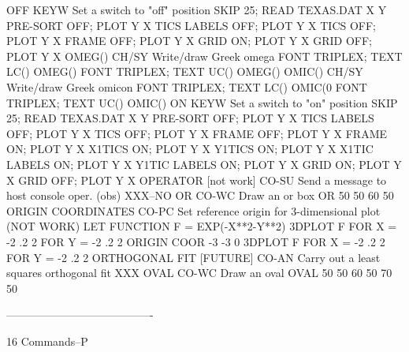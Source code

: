 OFF                         KEYW  Set a switch to "off" position
                                  SKIP 25; READ TEXAS.DAT X Y
                                  PRE-SORT OFF; PLOT Y X
                                  TICS LABELS OFF; PLOT Y X
                                  TICS OFF; PLOT Y X
                                  FRAME OFF; PLOT Y X
                                  GRID ON; PLOT Y X
                                  GRID OFF; PLOT Y X
OMEG()                      CH/SY Write/draw Greek omega
                                  FONT TRIPLEX; TEXT LC() OMEG()
                                  FONT TRIPLEX; TEXT UC() OMEG()
OMIC()                      CH/SY Write/draw Greek omicon
                                  FONT TRIPLEX; TEXT LC() OMIC(0
                                  FONT TRIPLEX; TEXT UC() OMIC()
ON                          KEYW  Set a switch to "on" position
                                  SKIP 25; READ TEXAS.DAT X Y
                                  PRE-SORT OFF; PLOT Y X
                                  TICS LABELS OFF; PLOT Y X
                                  TICS OFF; PLOT Y X
                                  FRAME OFF; PLOT Y X
                                  FRAME ON; PLOT Y X
                                  X1TICS ON; PLOT Y X
                                  Y1TICS ON; PLOT Y X
                                  X1TIC LABELS ON; PLOT Y X
                                  Y1TIC LABELS ON; PLOT Y X
                                  GRID ON; PLOT Y X
                                  GRID OFF; PLOT Y X
OPERATOR     [not work]     CO-SU Send a message to host console oper. (obs)
                                  XXX--NO
OR                          CO-WC Draw an or box
                                  OR 50 50 60 50
ORIGIN COORDINATES          CO-PC Set reference origin for 3-dimensional plot
(NOT WORK)                        LET FUNCTION F = EXP(-X**2-Y**2)
                                  3DPLOT F FOR X = -2 .2 2 FOR Y = -2 .2 2
                                  ORIGIN COOR -3 -3 0
                                  3DPLOT F FOR X = -2 .2 2 FOR Y = -2 .2 2
ORTHOGONAL FIT [FUTURE]     CO-AN Carry out a least squares orthogonal fit
                                  XXX
OVAL                        CO-WC Draw an oval
                                  OVAL 50 50 60 50 70 50
 
----------------------------------------
 
16
Commands--P
 
